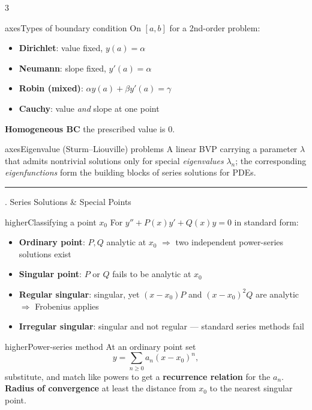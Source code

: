 \documentclass[10pt]{article}
\newcommand{\lab}[1]{\textcolor{ink}{\sffamily\footnotesize\textbf{#1}}\;}
\newcommand{\sect}[2]{%
  \begin{tcolorbox}[blanker, breakable, before skip=2pt, after skip=2pt]
    \begingroup\sffamily\bfseries\normalsize\color{#1}%
    {\color{#1}\rule[-1pt]{3pt}{12pt}}\;#2\endgroup
    \par\vspace{1pt}{\color{#1}\hrule height 1pt}
\end{tcolorbox}}
\begin{document}
\begin{multicols}{3}
  \begin{card}{axes}{Types of boundary condition}
    On $[a,b]$ for a 2nd-order problem:
    \begin{itemize}
      \item \textbf{Dirichlet}: value fixed, $y(a)=\alpha$
      \item \textbf{Neumann}: slope fixed, $y'(a)=\alpha$
      \item \textbf{Robin (mixed)}: $\alpha y(a)+\beta y'(a)=\gamma$
      \item \textbf{Cauchy}: value \emph{and} slope at one point
    \end{itemize}
    \lab{Homogeneous BC} the prescribed value is $0$.
  \end{card}

  \begin{card}{axes}{Eigenvalue (Sturm--Liouville) problems}
    A linear BVP carrying a parameter $\lambda$ that admits nontrivial solutions only for special \emph{eigenvalues} $\lambda_n$; the corresponding \emph{eigenfunctions} form the building blocks of series solutions for PDEs.
  \end{card}

  \columnbreak
  \sect{higher}{7.\; Series Solutions \& Special Points}

  \begin{card}{higher}{Classifying a point $x_0$}
    For $y''+P(x)y'+Q(x)y=0$ in standard form:
    \begin{itemize}
      \item \textbf{Ordinary point}: $P,Q$ analytic at $x_0$ $\Rightarrow$ two independent power-series solutions exist
      \item \textbf{Singular point}: $P$ or $Q$ fails to be analytic at $x_0$
      \item \textbf{Regular singular}: singular, yet $(x{-}x_0)P$ and $(x{-}x_0)^2Q$ are analytic $\Rightarrow$ Frobenius applies
      \item \textbf{Irregular singular}: singular and not regular --- standard series methods fail
    \end{itemize}
  \end{card}

  \begin{card}{higher}{Power-series method}
    At an ordinary point set
    \[
      y=\sum_{n\ge 0} a_n (x-x_0)^n,
    \]
    substitute, and match like powers to get a \textbf{recurrence relation} for the $a_n$.\\[2pt]
    \lab{Radius of convergence} at least the distance from $x_0$ to the nearest singular point.
  \end{card}


\end{multicols}
\end{document}

